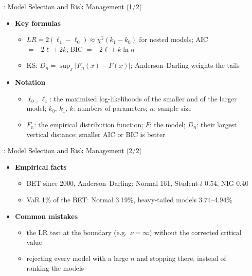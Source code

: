 \begin{frame}{: Model Selection and Risk Management (1/2)}
\itemsize{\small}
\begin{itemize}
    \item \textbf{Key formulas}
    \begin{itemize}
        \item $LR = 2(\ell_1 - \ell_0) \approx \chi^2(k_1 - k_0)$ for nested models; AIC $= -2\ell + 2k$, BIC $= -2\ell + k\ln n$
        \item KS: $D_n = \sup_x|F_n(x) - F(x)|$; Anderson--Darling weights the tails
    \end{itemize}
    \item \textbf{Notation}
    \begin{itemize}
        \item $\ell_0$, $\ell_1$: the maximised log-likelihoods of the smaller and of the larger model; $k_0$, $k_1$, $k$: numbers of parameters; $n$: sample size
        \item $F_n$: the empirical distribution function; $F$: the model; $D_n$: their largest vertical distance; smaller AIC or BIC is better
    \end{itemize}
\end{itemize}
\end{frame}

\begin{frame}{: Model Selection and Risk Management (2/2)}
\itemsize{\small}
\begin{itemize}
    \item \textbf{Empirical facts}
    \begin{itemize}
        \item BET since 2000, Anderson--Darling: Normal 161, Student-$t$ 0.54, NIG 0.40
        \item VaR 1\% of the BET: Normal 3.19\%, heavy-tailed models 3.74--4.94\%
    \end{itemize}
    \item \textbf{Common mistakes}
    \begin{itemize}
        \item the LR test at the boundary (e.g.\ $\nu = \infty$) without the corrected critical value
        \item rejecting every model with a large $n$ and stopping there, instead of ranking the models
    \end{itemize}
\end{itemize}
\end{frame}

